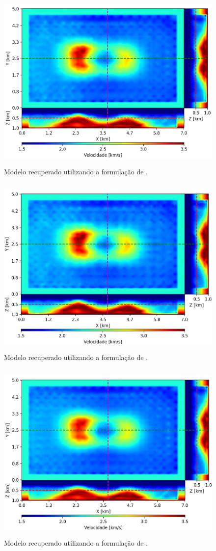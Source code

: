 \begin{figure}[H]
	\centering
	\includegraphics[width=12cm,height=9cm]{Imgs/Resultados/pod_refined.png}
	\caption{Modelo recuperado utilizando a formulação de .}
	\label{fig:pod_refined}	
\end{figure}


\begin{figure}[H]
	\centering
	\includegraphics[width=12cm,height=9cm]{Imgs/Resultados/fim_refined.png}
	\caption{Modelo recuperado utilizando a formulação de .}
	\label{fig:fim_refined}	
\end{figure}


\begin{figure}[H]
	\centering
	\includegraphics[width=12cm,height=9cm]{Imgs/Resultados/fsm_refined.png}
	\caption{Modelo recuperado utilizando a formulação de .}
	\label{fig:fsm_refined}	
\end{figure}





